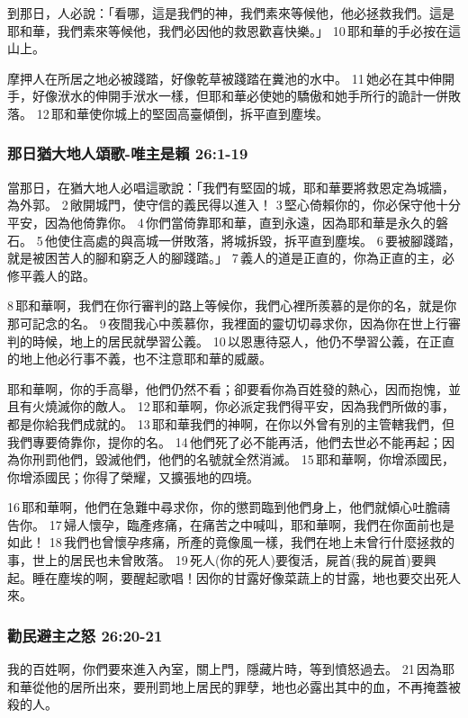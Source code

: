 到那日，人必說：「看哪，這是我們的神，我們素來等候他，他必拯救我們。這是耶和華，我們素來等候他，我們必因他的救恩歡喜快樂。」 10 耶和華的手必按在這山上。

摩押人在所居之地必被踐踏，好像乾草被踐踏在糞池的水中。 11 她必在其中伸開手，好像洑水的伸開手洑水一樣，但耶和華必使她的驕傲和她手所行的詭計一併敗落。 12 耶和華使你城上的堅固高臺傾倒，拆平直到塵埃。

\subsubsection{那日猶大地人頌歌-唯主是賴 26:1-19}
當那日，在猶大地人必唱這歌說：「我們有堅固的城，耶和華要將救恩定為城牆，為外郭。 2 敞開城門，使守信的義民得以進入！ 3 堅心倚賴你的，你必保守他十分平安，因為他倚靠你。 4 你們當倚靠耶和華，直到永遠，因為耶和華是永久的磐石。 5 他使住高處的與高城一併敗落，將城拆毀，拆平直到塵埃。 6 要被腳踐踏，就是被困苦人的腳和窮乏人的腳踐踏。」 7 義人的道是正直的，你為正直的主，必修平義人的路。

8 耶和華啊，我們在你行審判的路上等候你，我們心裡所羨慕的是你的名，就是你那可記念的名。 9 夜間我心中羨慕你，我裡面的靈切切尋求你，因為你在世上行審判的時候，地上的居民就學習公義。 10 以恩惠待惡人，他仍不學習公義，在正直的地上他必行事不義，也不注意耶和華的威嚴。

耶和華啊，你的手高舉，他們仍然不看；卻要看你為百姓發的熱心，因而抱愧，並且有火燒滅你的敵人。 12 耶和華啊，你必派定我們得平安，因為我們所做的事，都是你給我們成就的。 13 耶和華我們的神啊，在你以外曾有別的主管轄我們，但我們專要倚靠你，提你的名。 14 他們死了必不能再活，他們去世必不能再起；因為你刑罰他們，毀滅他們，他們的名號就全然消滅。 15 耶和華啊，你增添國民，你增添國民；你得了榮耀，又擴張地的四境。

16 耶和華啊，他們在急難中尋求你，你的懲罰臨到他們身上，他們就傾心吐膽禱告你。 17 婦人懷孕，臨產疼痛，在痛苦之中喊叫，耶和華啊，我們在你面前也是如此！ 18 我們也曾懷孕疼痛，所產的竟像風一樣，我們在地上未曾行什麼拯救的事，世上的居民也未曾敗落。 19 死人(你的死人)要復活，屍首(我的屍首)要興起。睡在塵埃的啊，要醒起歌唱！因你的甘露好像菜蔬上的甘露，地也要交出死人來。

\subsubsection{勸民避主之怒 26:20-21}
我的百姓啊，你們要來進入內室，關上門，隱藏片時，等到憤怒過去。 21 因為耶和華從他的居所出來，要刑罰地上居民的罪孽，地也必露出其中的血，不再掩蓋被殺的人。

